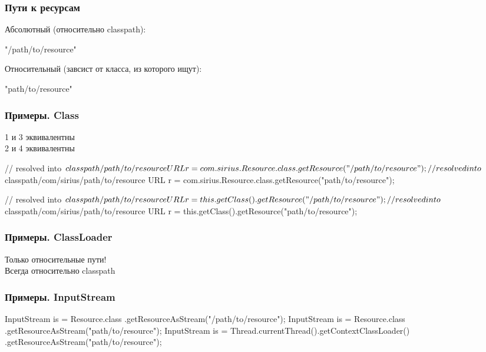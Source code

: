 \documentclass[russian,aspectratio=169,14pt]{beamer}
\begin{document}
\begin{frame}[fragile]
	\frametitle{Пути к ресурсам}
	Абсолютный (относительно classpath):
	\begin{listjava}
	"/path/to/resource"
	\end{listjava}
	Относительный (завсист от класса, из которого ищут):
	\begin{listjava}
	"path/to/resource"
	\end{listjava}
\end{frame}

\begin{frame}[fragile]
	\frametitle{Примеры. Class}
	1 и 3 эквивалентны\\
	2 и 4 эквивалентны
	\begin{listjava}
// resolved into $classpath/path/to/resource
URL r = com.sirius.Resource.class.getResource("/path/to/resource");
// resolved into $classpath/com/sirius/path/to/resource
URL r = com.sirius.Resource.class.getResource("path/to/resource");

// resolved into $classpath/path/to/resource
URL r = this.getClass().getResource("/path/to/resource");
// resolved into $classpath/com/sirius/path/to/resource
URL r = this.getClass().getResource("path/to/resource");
	\end{listjava}
\end{frame}

\begin{frame}[fragile]
	\frametitle{Примеры. ClassLoader}
	Только относительные пути!\\
	Всегда относительно classpath
\end{frame}

\begin{frame}[fragile]
	\frametitle{Примеры. InputStream}
	\begin{listjava}
InputStream is = Resource.class
                   .getResourceAsStream("/path/to/resource");
InputStream is = Resource.class
                   .getResourceAsStream("path/to/resource");
InputStream is = Thread.currentThread().getContextClassLoader()
                   .getResourceAsStream("path/to/resource");
	\end{listjava}
\end{frame}
\end{document}
